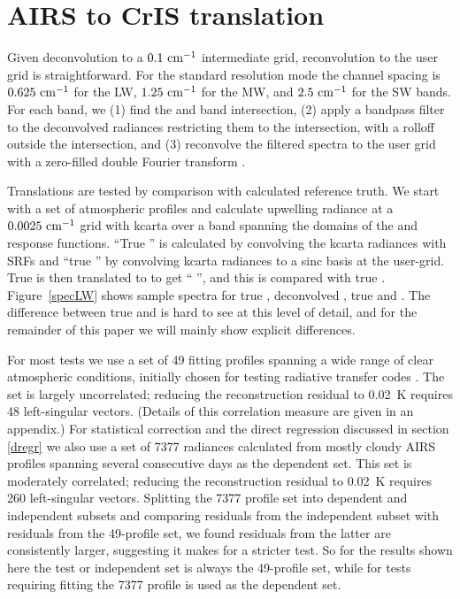 \documentclass[11pt]{article}
\begin{document}
\FloatBarrier
\section{AIRS to CrIS translation}
\label{airs2cris}

Given {\airs} deconvolution to a $0.1~\mbox{cm$^{-1}$}$ intermediate grid,
reconvolution to the {\cris} user grid is straightforward.  For the
{\cris} standard resolution mode the channel spacing is $0.625~\mbox{cm$^{-1}$}$
for the LW, $1.25~\mbox{cm$^{-1}$}$ for the MW, and $2.5~\mbox{cm$^{-1}$}$ for the SW bands.
For each {\cris} band, we (1) find the {\airs} and {\cris} band
intersection, (2) apply a bandpass filter to the deconvolved {\airs}
radiances restricting them to the intersection, with a rolloff
outside the intersection, and (3) reconvolve the filtered spectra to
the {\cris} user grid with a zero-filled double Fourier transform
\cite{git:finterp}. 

Translations are tested by comparison with calculated reference
truth.  We start with a set of atmospheric profiles and calculate
upwelling radiance at a $0.0025~\mbox{cm$^{-1}$}$ grid with kcarta \cite{kcarta1}
over a band spanning the domains of the {\airs} and {\cris} response
functions.  ``True {\airs}'' is calculated by convolving the kcarta
radiances with {\airs} SRFs and ``true {\cris}'' by convolving
kcarta radiances to a sinc basis at the {\cris} user-grid.  True
{\airs} is then translated to {\cris} to get ``{\airs} {\cris}'',
and this is compared with true {\cris}.  Figure~\ref{specLW} shows
sample spectra for true {\airs}, deconvolved {\airs}, true {\cris}
and {\airs} {\cris}.  The difference between true {\cris} and
{\airs} {\cris} is hard to see at this level of detail, and for the
remainder of this paper we will mainly show explicit differences.

For most tests we use a set of 49 fitting profiles spanning a wide
range of clear atmospheric conditions, initially chosen for testing
radiative transfer codes \cite{sarta1,sarta2}.  The set is largely
uncorrelated; reducing the reconstruction residual to 0.02~K
requires 48 left-singular vectors.  (Details of this correlation
measure are given in an appendix.)  For statistical correction and
the direct regression discussed in section \ref{dregr} we also use a
set of 7377 radiances calculated from mostly cloudy AIRS profiles
spanning several consecutive days as the dependent set.  This set is
moderately correlated; reducing the reconstruction residual to
0.02~K requires 260 left-singular vectors.  Splitting the 7377
profile set into dependent and independent subsets and comparing
residuals from the independent subset with residuals from the
49-profile set, we found residuals from the latter are consistently
larger, suggesting it makes for a stricter test.  So for the results
shown here the test or independent set is always the 49-profile set,
while for tests requiring fitting the 7377 profile is used as the
dependent set.
\end{document}
